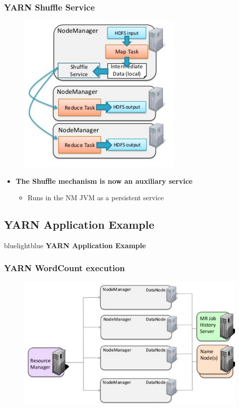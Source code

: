 \begin{frame}
\frametitle{YARN Shuffle Service}
\begin{figure}[h]
  \centering
  \includegraphics[scale=0.4]{./figures/yarn_shuffle}
  \label{fig:yarn_shuffle}
\end{figure}
\begin{itemize}
  \item {\bf The Shuffle mechanism is now an auxiliary service}
  \begin{itemize}
    \item Runs in the NM JVM as a persistent service
  \end{itemize}
\end{itemize}
\end{frame}

\subsection{YARN Application Example}
\begin{frame}
 \begin{colorblock}{blue}{lightblue}{ }
    \Large \textbf{YARN Application Example}
  \end{colorblock}
\end{frame}

\begin{frame}
\frametitle{YARN WordCount execution}
\begin{figure}[h]
  \centering
  \includegraphics[scale=0.4]{./figures/yarn_wc1}
  \label{fig:yarn_wc1}
\end{figure}
\end{frame}

